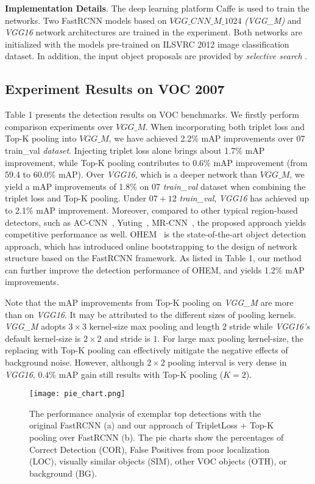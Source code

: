 \documentclass{article}
\begin{document}
{\noindent\textbf{Implementation Details}. The deep learning platform Caffe \cite{jia2014caffe} is used to train the networks. Two FastRCNN models based on $VGG\_CNN\_M\_1024$ \textit{(VGG\_M)} and \textit{VGG16} network architectures are trained in the experiment. Both networks are initialized with the models pre-trained on ILSVRC 2012 image classification dataset. In addition, the input object proposals are provided by \textit{selective search} \cite{2013selective}.

\subsection{Experiment Results on VOC 2007}

Table 1 presents the detection results on VOC benchmarks. We firstly perform comparison experiments over $VGG\_M$. When incorporating both triplet loss and Top-K pooling into $VGG\_M$, we have achieved 2.2\% mAP improvements over 07 train\_val \textit{dataset}. Injecting triplet loss alone brings about 1.7\% mAP improvement, while Top-K pooling contributes to 0.6\% mAP improvement (from 59.4 to 60.0\% mAP). Over \textit{VGG16}, which is a deeper network than $VGG\_M$, we yield a mAP improvements of 1.8\% on 07 \textit{train\_val} dataset when combining the triplet loss and Top-K pooling. Under $07+12$ \textit{train\_val}, \textit{VGG16} has achieved up to 2.1\% mAP improvement. Moreover, compared to other typical region-based detectors, such as AC-CNN~\cite{attentivecontext}, Yuting~\cite{zhang2015improving}, MR-CNN~\cite{multiregion}, the proposed approach yields competitive performance as well. OHEM~\cite{online_hard_example_mining} is the state-of-the-art object detection approach, which has introduced online bootstrapping to the design of network structure based on the FastRCNN framework. As listed in Table 1, our method can further improve the detection performance of OHEM, and yields 1.2\% mAP improvements.

Note that the mAP improvements from Top-K pooling on \textit{VGG\_M} are more than on \textit{VGG16}. It may be attributed to the different sizes of pooling kernels. \textit{VGG\_M} adopts $3\times3$ kernel-size max pooling and length $2$ stride while \textit{VGG16's} default kernel-size is $2\times2$ and stride is $1$. For large max pooling kernel-size, the replacing with Top-K pooling can effectively mitigate the negative effects of background noise. However, although $2\times2$ pooling interval is very dense in \textit{VGG16}, $0.4$\% mAP gain still results with Top-K pooling ($K=2$).
\begin{figure}
  \centering
  \texttt{[image: pie\_chart.png]}
  \vspace*{-5pt}
  \caption{The performance analysis of exemplar top detections with the original FastRCNN (a) and our approach of TripletLoss + Top-K pooling over FastRCNN (b). The pie charts show the percentages of Correct Detection (COR), False Positives from poor localization (LOC), visually similar objects (SIM), other VOC objects (OTH), or background (BG).}


\end{figure}}
\end{document}
